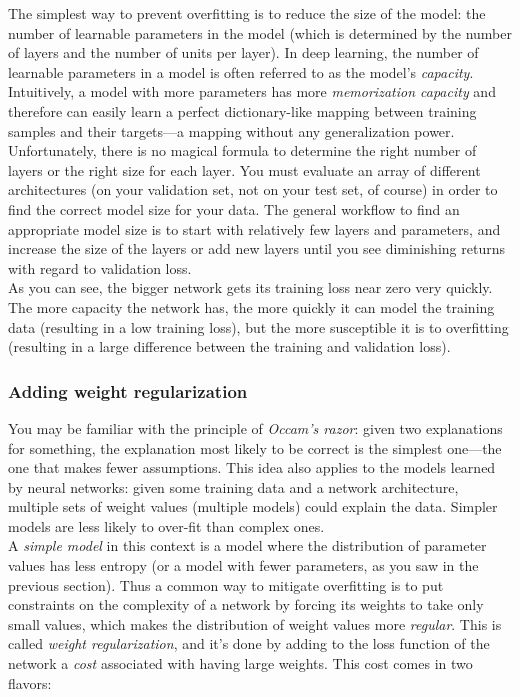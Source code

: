 \documentclass{article}
\numberwithin{equation}{section} %
\begin{document}
The simplest way to prevent overfitting is to reduce the size of the model: the number of learnable parameters in the model (which is determined by the number of layers and the number of units per layer). In deep learning, the number of learnable parameters in a model is often referred to as the model’s \textit{capacity}. Intuitively, a model with more parameters has more \textit{memorization capacity} and therefore can easily learn a perfect dictionary-like mapping between training samples and their targets—a mapping without any generalization power. \\

Unfortunately, there is no magical formula to determine the right number of layers or the right size for each layer. You must evaluate an array of different architectures (on your validation set, not on your test set, of course) in order to find the correct model size for your data. The general workflow to find an appropriate model size is to start with relatively few layers and parameters, and increase the size of the layers or add new layers until you see diminishing returns with regard to validation loss. \\

As you can see, the bigger network gets its training loss near zero very quickly. The more capacity the network has, the more quickly it can model the training data (resulting in a low training loss), but the more susceptible it is to overfitting (resulting in a large difference between the training and validation loss). \\

\subsubsection{Adding weight regularization}

You may be familiar with the principle of \textit{Occam’s razor}: given two explanations for something, the explanation most likely to be correct is the simplest one—the one that makes fewer assumptions. This idea also applies to the models learned by neural networks: given some training data and a network architecture, multiple sets of weight values (multiple models) could explain the data. Simpler models are less likely to over-fit than complex ones. \\

A \textit{simple model} in this context is a model where the distribution of parameter values has less entropy (or a model with fewer parameters, as you saw in the previous section). Thus a common way to mitigate overfitting is to put constraints on the complexity of a network by forcing its weights to take only small values, which makes the distribution of weight values more \textit{regular}. This is called \textit{weight regularization}, and it’s done by adding to the loss function of the network a \textit{cost} associated with having large weights. This cost comes in two flavors:
\end{document}
